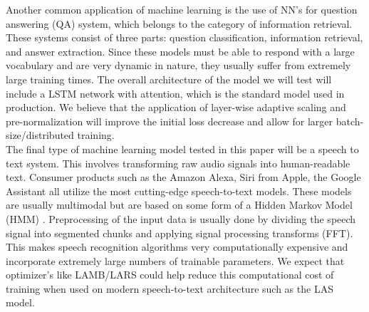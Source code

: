 Another common application of machine learning is the use of NN's for question answering (QA) system, which belongs to the category of information retrieval. These systems consist of three parts: question classification, information retrieval, and answer extraction. Since these models  must be able to respond with a large vocabulary and are very dynamic in nature, they usually suffer from extremely large training times. The overall architecture of the model we will test will include a LSTM network with attention, which is the standard model used in production. We believe that the application of layer-wise adaptive scaling and pre-normalization will improve the initial loss decrease and allow for larger batch-size/distributed training.\\


The final type of machine learning model tested in this paper will be a speech to text system. This involves transforming raw audio signals into human-readable text. Consumer products such as the Amazon Alexa, Siri from Apple, the Google Assistant all utilize the most cutting-edge speech-to-text models. These models are usually multimodal but are based on some form of a Hidden Markov Model (HMM) \cite{HMM}. Preprocessing of the input data is usually done by dividing the speech signal into segmented chunks and applying signal processing transforms (FFT)\cite{FFT}. This makes speech recognition algorithms very computationally expensive and incorporate extremely large numbers of trainable parameters. We expect that optimizer's like LAMB/LARS could help reduce this computational cost of training when used on modern speech-to-text architecture such as the LAS model\cite{LAS}.







